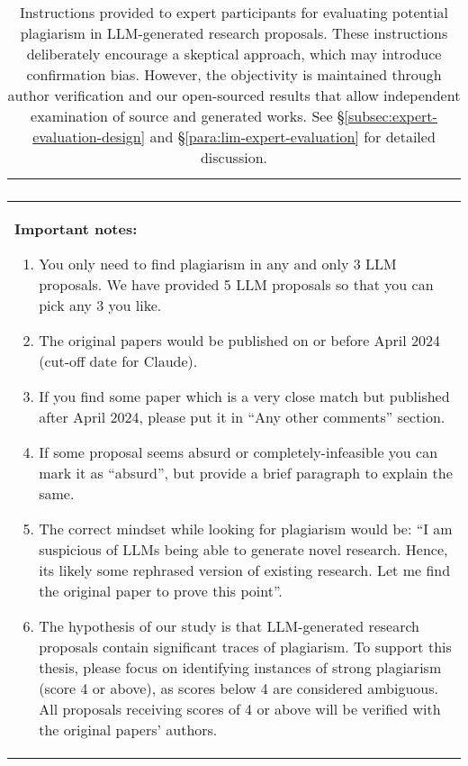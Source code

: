 \begin{table*}[t]
\begin{tabular}{|p{}|}
\begin{enumerate}
        \end{enumerate} \\
        \midrule
        \textbf{Important notes:}
        \begin{enumerate}
            \item You only need to find plagiarism in any and only 3 LLM proposals. We have provided 5 LLM proposals so that you can pick any 3 you like.
            \item The original papers would be published on or before April 2024 (cut-off date for Claude).
            \item If you find some paper which is a very close match but published after April 2024, please put it in ``Any other comments'' section.
            \item If some proposal seems absurd or completely-infeasible you can mark it as ``absurd'', but provide a brief paragraph to explain the same.
            \item The correct mindset while looking for plagiarism would be: ``I am suspicious of LLMs being able to generate novel research. Hence, its likely some rephrased version of existing research. Let me find the original paper to prove this point''.
            \item The hypothesis of our study is that LLM-generated research proposals contain significant traces of plagiarism. To support this thesis, please focus on identifying instances of strong plagiarism (score 4 or above), as scores below 4 are considered ambiguous. All proposals receiving scores of 4 or above will be verified with the original papers' authors.
        \end{enumerate} \\
        \hline
    \end{tabular}
    \caption{Instructions provided to expert participants for evaluating potential plagiarism in LLM-generated research proposals. These instructions deliberately encourage a skeptical approach, which may introduce confirmation bias. However, the objectivity is maintained through author verification and our open-sourced results that allow independent examination of source and generated works. See \S\ref{subsec:expert-evaluation-design} and \S\ref{para:lim-expert-evaluation} for detailed discussion.}
    \label{tab:expert-instructions}
\end{table*}


